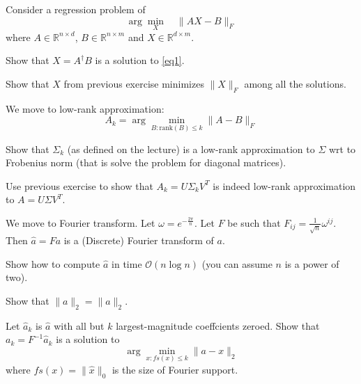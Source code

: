 \documentclass[12pt]{uebung}
\begin{document}
 

\newcommand{\bigo}{\mathcal{O}}
\renewcommand{\aufgname}{Exercise}

Consider a regression problem of 
\begin{equation}
\label{eq1}
\arg \min_{X}\quad \|AX - B\|_F
\end{equation}
where $A \in \mathbb{R}^{n \times d}$, $B \in \mathbb{R}^{n \times m}$ and $X \in \mathbb{R}^{d \times m}$.

\begin{aufg}
Show that $X = A^\dagger B$ is a solution to \eqref{eq1}.
\end{aufg}
\begin{aufg}
Show that $X$ from previous exercise minimizes $\|X\|_F$ among all the solutions.
\end{aufg}

\vspace{2cm}
We move to low-rank approximation:
$$A_k = \arg \min_{B : \text{rank}(B) \le k} \|A - B\|_F$$
\begin{aufg}
Show that $\Sigma_k$ (as defined on the lecture) is a low-rank approximation to $\Sigma$ wrt to Frobenius norm (that is solve the problem for diagonal matrices).
\end{aufg}
\begin{aufg}
Use previous exercise to show that $A_k = U \Sigma_k V^T$ is indeed low-rank approximation to $A = U \Sigma V^T$.
\end{aufg}

\vspace{2cm}

We move to Fourier transform. Let $\omega = e^{-\frac{2 \pi}{n}}$. Let $F$ be such that $F_{ij} = \frac{1}{\sqrt{n}}\omega^{ij}$. Then $\hat{a} = F a$ is a (Discrete) Fourier transform of $a$.
\begin{aufg}
Show how to compute $\hat{a}$ in time $\bigo(n \log n)$ (you can assume $n$ is a power of two).
\end{aufg}

\begin{aufg}
Show that $\|a\|_2 = \|\hat{a}\|_2$.
\end{aufg}

\begin{aufg}
Let $\hat{a}_k$ is $\hat{a}$ with all but $k$ largest-magnitude coeffcients zeroed. Show that $a_k = F^{-1} \hat{a}_k$ is a solution to
$$\arg \min_{x : fs(x) \le k} \|a - x\|_2$$
where $fs(x) = \|\hat{x}\|_0$ is the size of Fourier support.
\end{aufg}
\end{document}
